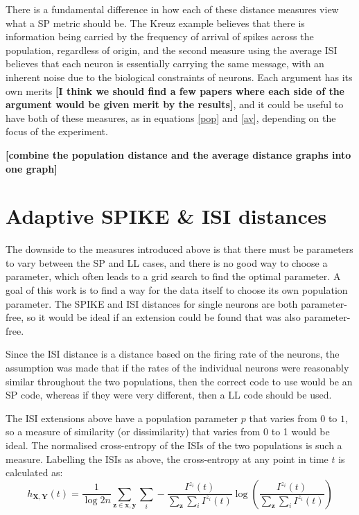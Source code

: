 \documentclass[12pt]{amsart}
\begin{document}
There is a fundamental difference in how each of these distance measures view what a SP metric should be.  The Kreuz example believes that there is information being carried by the frequency of arrival of spikes across the population, regardless of origin, and the second measure using the average ISI believes that each neuron is essentially carrying the same message, with an inherent noise due to the biological constraints of neurons.  Each argument has its own merits {\bf[I think we should find a few papers where each side of the argument would be given merit by the results]}, and it could be useful to have both of these measures, as in equations \ref{pop} and \ref{av}, depending on the focus of the experiment.

{\bf [combine the population distance and the average distance graphs into one graph]}

\newpage
\section{Adaptive SPIKE \& ISI distances}

The downside to the measures introduced above is that there must be parameters to vary between the SP and LL cases, and there is no good way to choose a parameter, which often leads to a grid search to find the optimal parameter.  A goal of this work is to find a way for the data itself to choose its own population parameter.  The SPIKE and ISI distances for single neurons are both parameter-free, so it would be ideal if an extension could be found that was also parameter-free.

Since the ISI distance is a distance based on the firing rate of the neurons, the assumption was made that if the rates of the individual neurons were reasonably similar throughout the two populations, then the correct code to use would be an SP code, whereas if they were very different, then a LL code should be used.

The ISI extensions above have a population parameter $p$ that varies from $0$ to $1$, so a measure of similarity (or dissimilarity) that varies from 0 to 1 would be ideal.  The normalised cross-entropy of the ISIs of the two populations is such a measure.  Labelling the ISIs as above, the cross-entropy at any point in time $t$ is calculated as:
\begin{equation}
h_{\mathbf{X}, \mathbf{Y}}(t) = \frac{1}{\log 2n}\sum_{\mathbf{z}\in\mathbf{x,y}}\sum_i -\frac{I^{z_i}(t)}{\sum_{\mathbf{z}}\sum_i I^{z_i}(t)} \log\left(\frac{I^{z_i}(t)}{\sum_{\mathbf{z}}\sum_i I^{z_i}(t)}\right)
\end{equation}
\end{document}
